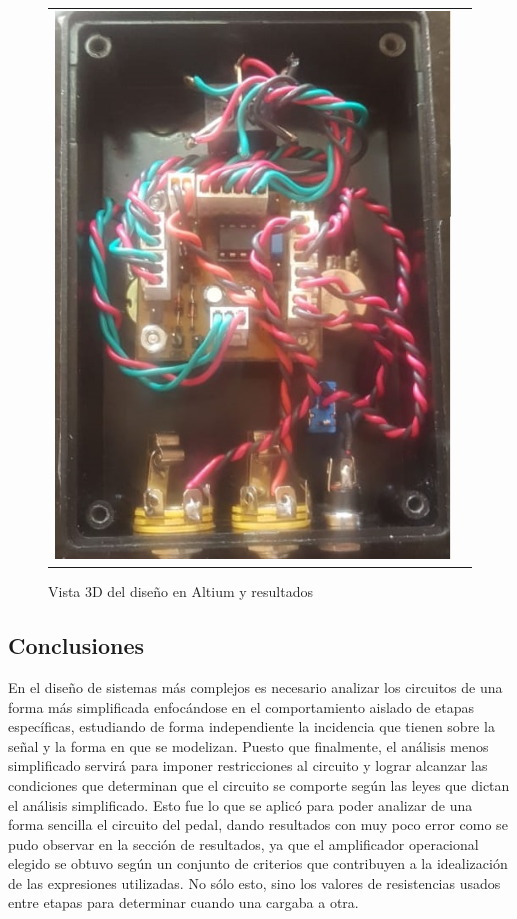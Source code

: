 \begin{figure}[H]
\begin{tabular}{c c}
        \includegraphics[scale=0.6]{../EJ5/Recursos/hecho_frente_2.jpeg}
    \end{tabular}
    \caption{Vista 3D del dise\~no en Altium y resultados}
    \label{}
\end{figure}

\subsection{Conclusiones}
En el dise\~no de sistemas m\'as complejos es necesario analizar los circuitos de una forma m\'as simplificada enfoc\'andose en el comportamiento
aislado de etapas espec\'ificas, estudiando de forma independiente la incidencia que tienen sobre la se\~nal y la forma en que se modelizan. Puesto que finalmente,
el an\'alisis menos simplificado servir\'a para imponer restricciones al circuito y lograr alcanzar las condiciones que determinan que el circuito
se comporte seg\'un las leyes que dictan el an\'alisis simplificado. Esto fue lo que se aplic\'o para poder analizar de una forma sencilla el circuito del pedal,
dando resultados con muy poco error como se pudo observar en la secci\'on de resultados, ya que el amplificador operacional elegido se obtuvo seg\'un un conjunto de criterios
que contribuyen a la idealizaci\'on de las expresiones utilizadas. No s\'olo esto, sino los valores de resistencias usados entre etapas para determinar cuando una cargaba a otra.